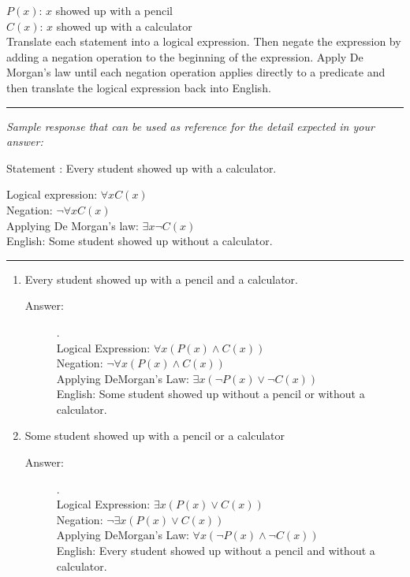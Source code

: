 \documentclass[12pt, oneside]{article}
\begin{document}
\begin{enumerate}
$P(x)$: $x$ showed up with a pencil \\
$C(x)$: $x$ showed up with a calculator\\

Translate each statement into a logical expression. Then negate the expression by adding a negation operation to the beginning of the expression. Apply De Morgan's law until each negation operation applies directly to a predicate and then translate the logical expression back into English. 

\rule{0.5\textwidth}{.4pt}

{\it Sample response that can be used as reference for the detail expected 
in your answer:} 

Statement : Every student showed up with a calculator.

Logical expression: $\forall x C(x)$\\
Negation: $\neg \forall x C(x)$\\
Applying De Morgan's law: $\exists x \neg C(x)$\\
English: Some student showed up without a calculator.\\
\rule{0.5\textwidth}{.4pt}


\begin{enumerate}
    \item Every student showed up with a pencil and a calculator. 
    \begin{description}
        \item[Answer:].\\
        Logical Expression: $\forall x(P(x) \land C(x))$ \\
        Negation: $\lnot \forall x(P(x) \land C(x))$\\
        Applying DeMorgan's Law: $\exists x(\lnot P(x) \lor \lnot C(x))$\\
        English: Some student showed up without a pencil or without a calculator.
    \end{description}
    \item Some student showed up with a pencil or a calculator
    \begin{description}
        \item[Answer:].\\
        Logical Expression: $\exists x(P(x) \lor C(x))$ \\
        Negation: $\lnot \exists x(P(x) \lor C(x))$\\
        Applying DeMorgan's Law: $\forall x(\lnot P(x) \land \lnot C(x))$\\
        English: Every student showed up without a pencil and without a calculator.
    \end{description}
\end{enumerate}

\end{enumerate}
\end{document}
